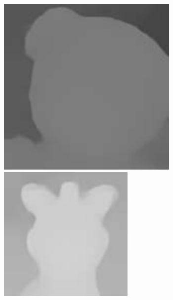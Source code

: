 \documentclass{bjtu-bachelor-thesis}
\begin{document}
\begin{figure}[!htbp]
\begin{minipage}[b]{\linewidth}
{\begin{minipage}[b]{0.085\linewidth}
      \includegraphics[width=\linewidth]{figures/doll/dgdie_0.pdf}\vspace{2pt}
      \includegraphics[width=\linewidth]{figures/doll/dgdie_1.pdf}

\end{minipage}}
\end{minipage}
\end{figure}
\end{document}
